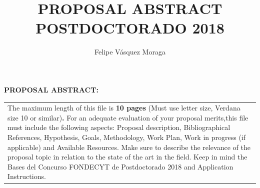 \documentclass[10pt]{article}
\author{Felipe Vásquez Moraga}
\title{PROPOSAL ABSTRACT POSTDOCTORADO 2018}
\begin{document}
\noindent \textbf{PROPOSAL ABSTRACT:}

\noindent \textbf{}

{\raggedright
\vspace{3pt} \noindent
\begin{tabular}{|p{514pt}|}
\hline
\parbox{514pt} {\raggedright\vspace{3pt}
The maximum length of this file is \textbf{10 pages} (Must use letter size, Verdana size 10 or similar)\textbf{. }For an adequate evaluation of your proposal merits,this file must include the following aspects: Proposal description, Bibliographical References, Hypothesis, Goals, Methodology, Work Plan, Work in progress (if applicable) and Available Resources.
Make sure to describe the relevance of the proposal topic in relation to the state of the art in the field.
Keep in mind the Bases del Concurso FONDECYT de Postdoctorado 2018 and Application Instructions.} \\
\hline
\end{tabular}
\vspace{2pt}

}

\end{document}
